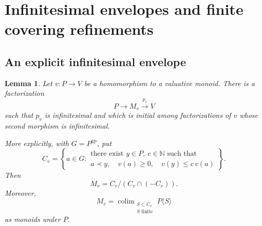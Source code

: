 \documentclass[11pt]{article}
\newtheorem{lemma}[theorem]{Lemma}
\theoremstyle{definition}
\theoremstyle{remark}
\DeclareMathOperator{\colim}{colim}
\newcommand{\gp}{\mathrm{gp}}
\newcommand{\NN}{\mathbb N}
\begin{document}
\section{Infinitesimal envelopes and finite covering refinements}

\subsection{An explicit infinitesimal envelope}

\begin{lemma}\label{lem:envelope}
Let \(v:P\to V\) be a homomorphism to a valuative monoid. There is a
factorization
\[
P\longrightarrow M_v\xrightarrow{p_v}V
\]
such that \(p_v\) is infinitesimal and which is initial among
factorizations of \(v\) whose second morphism is infinitesimal.

More explicitly, with \(G=P^{\gp}\), put
\begin{equation}\label{eq:envelope-cone}
C_v=
\left\{
a\in G:
\begin{array}{l}
\text{there exist }y\in P,\ c\in\NN\text{ such that}\\
a\prec y,\quad v(a)\ge0,\quad v(y)\le c\,v(a)
\end{array}
\right\}.
\end{equation}
Then
\[
M_v=C_v/(C_v\cap(-C_v)).
\]
Moreover,
\begin{equation}\label{eq:envelope-colimit}
M_v=\colim_{\substack{S\subset C_v\\S\text{ finite}}}
P\langle S\rangle
\end{equation}
as monoids under \(P\).
\end{lemma}
\end{document}
